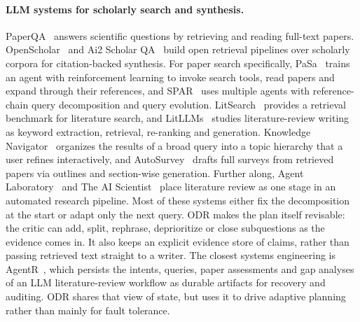 \documentclass{article}
\newcommand{\sys}{ODR}
\begin{document}
\paragraph{LLM systems for scholarly search and synthesis.}
PaperQA~\citep{lala2023paperqa} answers scientific questions by retrieving
and reading full-text papers. OpenScholar~\citep{asai2024openscholar} and
Ai2 Scholar QA~\citep{singh2025scholarqa} build open retrieval pipelines
over scholarly corpora for citation-backed synthesis. For paper search
specifically, PaSa~\citep{he2025pasa} trains an agent with reinforcement
learning to invoke search tools, read papers and expand through their
references, and SPAR~\citep{shi2025spar} uses multiple agents with
reference-chain query decomposition and query evolution. LitSearch~\citep{ajith2024litsearch}
provides a retrieval benchmark for literature search, and
LitLLMs~\citep{agarwal2024litllms} studies literature-review writing as
keyword extraction, retrieval, re-ranking and generation. Knowledge
Navigator~\citep{katz2024knowledgenavigator} organizes the results of a
broad query into a topic hierarchy that a user refines interactively, and
AutoSurvey~\citep{wang2024autosurvey} drafts full surveys from retrieved
papers via outlines and section-wise generation. Further along, Agent
Laboratory~\citep{schmidgall2025agentlab} and The AI
Scientist~\citep{lu2024aiscientist} place literature review as one stage in
an automated research pipeline. Most of these systems either fix the
decomposition at the start or adapt only the next query. \sys{} makes the
plan itself revisable: the critic can add, split, rephrase, deprioritize or
close subquestions as the evidence comes in. It also keeps an explicit
evidence store of claims, rather than passing retrieved text straight to a
writer. The closest systems engineering is AgentR~\citep{samanta2026agentr},
which persists the intents, queries, paper assessments and gap analyses of
an LLM literature-review workflow as durable artifacts for recovery and
auditing. \sys{} shares that view of state, but uses it to drive adaptive
planning rather than mainly for fault tolerance.
\end{document}
